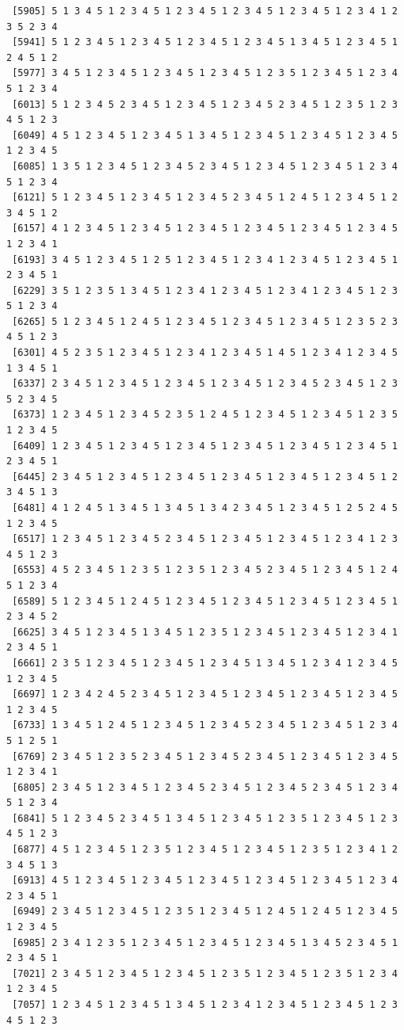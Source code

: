 \documentclass[
  english,
]{book}
\begin{document}
\begin{verbatim}
 [5905] 5 1 3 4 5 1 2 3 4 5 1 2 3 4 5 1 2 3 4 5 1 2 3 4 5 1 2 3 4 1 2 3 5 2 3 4
 [5941] 5 1 2 3 4 5 1 2 3 4 5 1 2 3 4 5 1 2 3 4 5 1 3 4 5 1 2 3 4 5 1 2 4 5 1 2
 [5977] 3 4 5 1 2 3 4 5 1 2 3 4 5 1 2 3 4 5 1 2 3 5 1 2 3 4 5 1 2 3 4 5 1 2 3 4
 [6013] 5 1 2 3 4 5 2 3 4 5 1 2 3 4 5 1 2 3 4 5 2 3 4 5 1 2 3 5 1 2 3 4 5 1 2 3
 [6049] 4 5 1 2 3 4 5 1 2 3 4 5 1 3 4 5 1 2 3 4 5 1 2 3 4 5 1 2 3 4 5 1 2 3 4 5
 [6085] 1 3 5 1 2 3 4 5 1 2 3 4 5 2 3 4 5 1 2 3 4 5 1 2 3 4 5 1 2 3 4 5 1 2 3 4
 [6121] 5 1 2 3 4 5 1 2 3 4 5 1 2 3 4 5 2 3 4 5 1 2 4 5 1 2 3 4 5 1 2 3 4 5 1 2
 [6157] 4 1 2 3 4 5 1 2 3 4 5 1 2 3 4 5 1 2 3 4 5 1 2 3 4 5 1 2 3 4 5 1 2 3 4 1
 [6193] 3 4 5 1 2 3 4 5 1 2 5 1 2 3 4 5 1 2 3 4 1 2 3 4 5 1 2 3 4 5 1 2 3 4 5 1
 [6229] 3 5 1 2 3 5 1 3 4 5 1 2 3 4 1 2 3 4 5 1 2 3 4 1 2 3 4 5 1 2 3 5 1 2 3 4
 [6265] 5 1 2 3 4 5 1 2 4 5 1 2 3 4 5 1 2 3 4 5 1 2 3 4 5 1 2 3 5 2 3 4 5 1 2 3
 [6301] 4 5 2 3 5 1 2 3 4 5 1 2 3 4 1 2 3 4 5 1 4 5 1 2 3 4 1 2 3 4 5 1 3 4 5 1
 [6337] 2 3 4 5 1 2 3 4 5 1 2 3 4 5 1 2 3 4 5 1 2 3 4 5 2 3 4 5 1 2 3 5 2 3 4 5
 [6373] 1 2 3 4 5 1 2 3 4 5 2 3 5 1 2 4 5 1 2 3 4 5 1 2 3 4 5 1 2 3 5 1 2 3 4 5
 [6409] 1 2 3 4 5 1 2 3 4 5 1 2 3 4 5 1 2 3 4 5 1 2 3 4 5 1 2 3 4 5 1 2 3 4 5 1
 [6445] 2 3 4 5 1 2 3 4 5 1 2 3 4 5 1 2 3 4 5 1 2 3 4 5 1 2 3 4 5 1 2 3 4 5 1 3
 [6481] 4 1 2 4 5 1 3 4 5 1 3 4 5 1 3 4 2 3 4 5 1 2 3 4 5 1 2 5 2 4 5 1 2 3 4 5
 [6517] 1 2 3 4 5 1 2 3 4 5 2 3 4 5 1 2 3 4 5 1 2 3 4 5 1 2 3 4 1 2 3 4 5 1 2 3
 [6553] 4 5 2 3 4 5 1 2 3 5 1 2 3 5 1 2 3 4 5 2 3 4 5 1 2 3 4 5 1 2 4 5 1 2 3 4
 [6589] 5 1 2 3 4 5 1 2 4 5 1 2 3 4 5 1 2 3 4 5 1 2 3 4 5 1 2 3 4 5 1 2 3 4 5 2
 [6625] 3 4 5 1 2 3 4 5 1 3 4 5 1 2 3 5 1 2 3 4 5 1 2 3 4 5 1 2 3 4 1 2 3 4 5 1
 [6661] 2 3 5 1 2 3 4 5 1 2 3 4 5 1 2 3 4 5 1 3 4 5 1 2 3 4 1 2 3 4 5 1 2 3 4 5
 [6697] 1 2 3 4 2 4 5 2 3 4 5 1 2 3 4 5 1 2 3 4 5 1 2 3 4 5 1 2 3 4 5 1 2 3 4 5
 [6733] 1 3 4 5 1 2 4 5 1 2 3 4 5 1 2 3 4 5 2 3 4 5 1 2 3 4 5 1 2 3 4 5 1 2 5 1
 [6769] 2 3 4 5 1 2 3 5 2 3 4 5 1 2 3 4 5 2 3 4 5 1 2 3 4 5 1 2 3 4 5 1 2 3 4 1
 [6805] 2 3 4 5 1 2 3 4 5 1 2 3 4 5 2 3 4 5 1 2 3 4 5 2 3 4 5 1 2 3 4 5 1 2 3 4
 [6841] 5 1 2 3 4 5 2 3 4 5 1 3 4 5 1 2 3 4 5 1 2 3 5 1 2 3 4 5 1 2 3 4 5 1 2 3
 [6877] 4 5 1 2 3 4 5 1 2 3 5 1 2 3 4 5 1 2 3 4 5 1 2 3 5 1 2 3 4 1 2 3 4 5 1 3
 [6913] 4 5 1 2 3 4 5 1 2 3 4 5 1 2 3 4 5 1 2 3 4 5 1 2 3 4 5 1 2 3 4 2 3 4 5 1
 [6949] 2 3 4 5 1 2 3 4 5 1 2 3 5 1 2 3 4 5 1 2 4 5 1 2 4 5 1 2 3 4 5 1 2 3 4 5
 [6985] 2 3 4 1 2 3 5 1 2 3 4 5 1 2 3 4 5 1 2 3 4 5 1 3 4 5 2 3 4 5 1 2 3 4 5 1
 [7021] 2 3 4 5 1 2 3 4 5 1 2 3 4 5 1 2 3 5 1 2 3 4 5 1 2 3 5 1 2 3 4 1 2 3 4 5
 [7057] 1 2 3 4 5 1 2 3 4 5 1 3 4 5 1 2 3 4 1 2 3 4 5 1 2 3 4 5 1 2 3 4 5 1 2 3

\end{verbatim}
\end{document}
